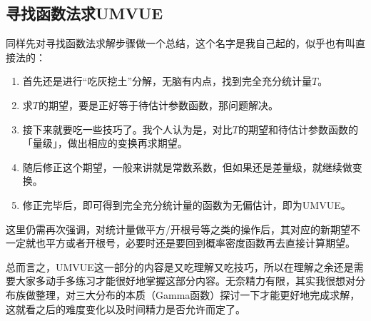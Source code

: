 \documentclass[10pt, a4paper]{article}
\begin{document}
\subsection{寻找函数法求UMVUE}
同样先对寻找函数法求解步骤做一个总结，这个名字是我自己起的，似乎也有叫直接法的：
\begin{enumerate}
    \item 首先还是进行“吃灰挖土”分解，无脑有内点，找到完全充分统计量$T$。
    \item 求$T$的期望，要是正好等于待估计参数函数，那问题解决。
    \item 接下来就要吃一些技巧了。我个人认为是，对比$T$的期望和待估计参数函数的「量级」，做出相应的变换再求期望。
    \item 随后修正这个期望，一般来讲就是常数系数，但如果还是差量级，就继续做变换。
    \item 修正完毕后，即可得到完全充分统计量的函数为无偏估计，即为UMVUE。
\end{enumerate} \par
这里仍需再次强调，对统计量做平方/开根号等之类的操作后，其对应的新期望不一定就也平方或者开根号，必要时还是要回到概率密度函数再去直接计算期望。\par
总而言之，UMVUE这一部分的内容是又吃理解又吃技巧，所以在理解之余还是需要大家多动手多练习才能很好地掌握这部分内容。无奈精力有限，其实我很想对分布族做整理，对三大分布的本质（Gamma函数）探讨一下才能更好地完成求解，这就看之后的难度变化以及时间精力是否允许而定了。
\end{document}
